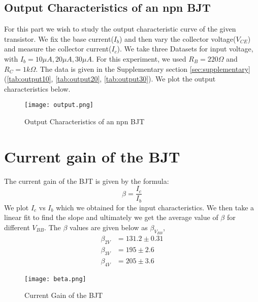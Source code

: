 \documentclass{scrartcl}
\newcommand{\1}{\mathbbm{1}}
\begin{document}
\subsection{Output Characteristics of an npn BJT}
For this part we wish to study the output characteristic curve of the given transistor. We fix the base current($I_b$) and then vary the collector voltage($V_{CE}$) and measure the collector current($I_c$). We take three 
 Datasets for input voltage, with $I_b = 10 \mu A, 20 \mu A, 30 \mu A$. For this experiment, we used $R_B = 220 \Omega$ and $R_C = 1 k\Omega$. The data is
 given in the Supplementary section \cref{sec:supplementary}(\cref{tab:output10}, \cref{tab:output20}, \cref{tab:output30}). We plot the output characteristics below.
\begin{figure}[h]
        \centering
        \texttt{[image: output.png]}
        \caption{Output Characteristics of an npn BJT}
\end{figure}
\section{Current gain of the BJT}
The current gain of the BJT is given by the formula:
\begin{equation}
        \beta = \frac{I_c}{I_b}
\end{equation}
We plot $I_c$ vs $I_b$ which we obtained for the input characteristics. We then take a linear fit to find the slope and ultimately we get the average value of $\beta$ 
for different $V_{BB}$. The $\beta$ values are given below as $\beta_{V_{BB}}$,
\begin{align}
        \beta_{2V} &= 131.2 \pm 0.31 \\
        \beta_{3V} &= 195 \pm 2.6\\
        \beta_{4V} &= 205 \pm 3.6
\end{align}
\begin{figure}
        \centering
        \texttt{[image: beta.png]}
        \caption{Current Gain of the BJT}
\end{figure}
\pagebreak
\end{document}
